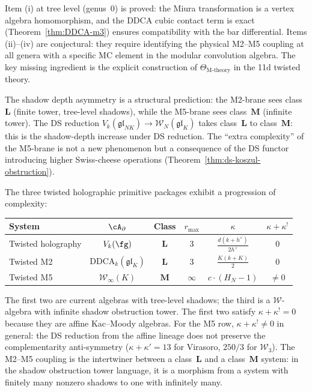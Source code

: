 \begin{remark}
\label{rem:M2-M5-proved-vs-conjectural}
Item (i) at tree level (genus~$0$) is proved: the Miura
transformation is a vertex algebra homomorphism, and
the DDCA cubic contact term is exact
(Theorem~\ref{thm:DDCA-m3}) ensures compatibility with
the bar differential. Items (ii)--(iv) are conjectural:
they require identifying the physical M2--M5 coupling at
all genera with a specific MC element in the modular
convolution algebra. The key missing ingredient is the
explicit construction of $\Theta_{\mathrm{M\text{-}theory}}$
in the 11d twisted theory.

The shadow depth asymmetry is a structural prediction:
the M2-brane sees class~$\mathbf{L}$ (finite tower, tree-level
shadows), while the M5-brane sees class~$\mathbf{M}$ (infinite
tower). The DS reduction $V_k(\mathfrak{gl}_{NK}) \to
\mathcal{W}_N(\mathfrak{gl}_K)$ takes class~$\mathbf{L}$ to
class~$\mathbf{M}$: this is the shadow-depth increase under DS
reduction. The ``extra complexity'' of the M5-brane is not
a new phenomenon but a consequence of the DS functor
introducing higher Swiss-cheese operations
(Theorem~\ref{thm:ds-koszul-obstruction}).
\end{remark}

\begin{remark}
\label{rem:three-package-comparison}
The three twisted holographic primitive packages exhibit a
progression of complexity:
\begin{center}
\renewcommand{\arraystretch}{1.2}
\small
\begin{tabular}{lccccc}
\textbf{System} & $\cA_\partial$ & \textbf{Class} & $r_{\max}$
 & $\kappa$ & $\kappa + \kappa^!$ \\
\hline
Twisted holography & $V_k(\fg)$ & $\mathbf{L}$ & $3$
 & $\frac{d(k + h^\vee)}{2h^\vee}$ & $0$ \\
Twisted M2 & $\mathrm{DDCA}_k(\mathfrak{gl}_K)$ & $\mathbf{L}$ & $3$
 & $\frac{K(k + K)}{2}$ & $0$ \\
Twisted M5 & $\mathcal{W}_\infty(K)$ & $\mathbf{M}$ & $\infty$
 & $c \cdot (H_N {-} 1)$ & $\ne 0$
\end{tabular}
\end{center}
The first two are current algebras with tree-level shadows;
the third is a $\mathcal{W}$-algebra with infinite shadow obstruction tower.
The first two satisfy $\kappa + \kappa^! = 0$ because they are
affine Kac--Moody algebras. For the M5 row,
$\kappa + \kappa^! \ne 0$ in general: the DS reduction from the
affine lineage does not preserve the complementarity anti-symmetry
\textup{(}$\kappa + \kappa' = 13$ for Virasoro,
$250/3$ for $\mathcal{W}_3$\textup{)}.
The M2--M5 coupling is the intertwiner
between a class~$\mathbf{L}$ and a class~$\mathbf{M}$ system:
in the shadow obstruction tower language, it is a morphism from a system with
finitely many nonzero shadows to one with infinitely many.
\end{remark}


